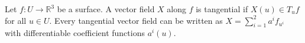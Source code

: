 Let $f: U \to \mathbb{R}^3$ be a surface. A vector field $X$ along $f$ is tangential if $X(u) \in T_u f$ for all $u \in U$. Every tangential vector field can be written as $X = \sum_{i=1}^2 a^i f_{u^i}$ with differentiable coefficient functions $a^i(u)$.